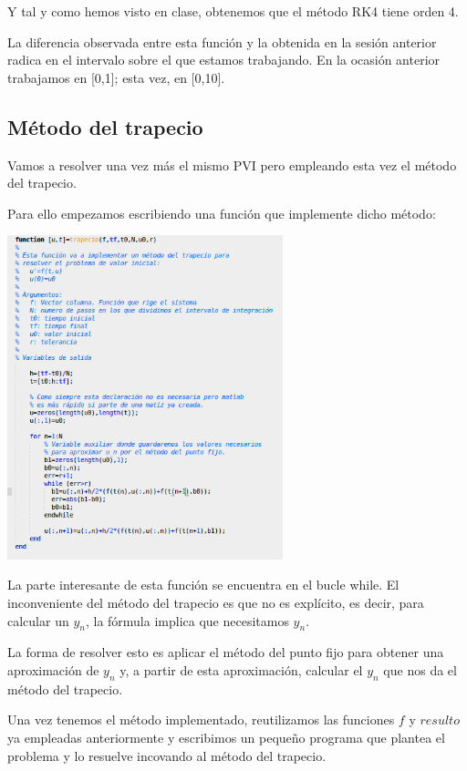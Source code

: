 Y tal y como hemos visto en clase, obtenemos que el método RK4 tiene orden 4.

\obs La diferencia observada entre esta función y la obtenida en la sesión anterior radica en el intervalo sobre el que estamos trabajando. En la ocasión anterior trabajamos en [0,1]; esta vez, en [0,10].


\subsection{Método del trapecio}
Vamos a resolver una vez más el mismo PVI pero empleando esta vez el método del trapecio.

Para ello empezamos escribiendo una función que implemente dicho método:
\begin{center}
\includegraphics[width=0.6\textwidth]{img/trapecio.png}
\end{center}

La parte interesante de esta función se encuentra en el bucle while. El inconveniente del método del trapecio es que no es explícito, es decir, para calcular un $y_{n}$, la fórmula implica que necesitamos $y_n$.

La forma de resolver esto es aplicar el método del punto fijo para obtener una aproximación de $y_n$ y, a partir de esta aproximación, calcular el $y_n$ que nos da el método del trapecio.

Una vez tenemos el método implementado, reutilizamos las funciones $f$ y $resulto$ ya empleadas anteriormente y escribimos un pequeño programa que plantea el problema y lo resuelve incovando al método del trapecio.

